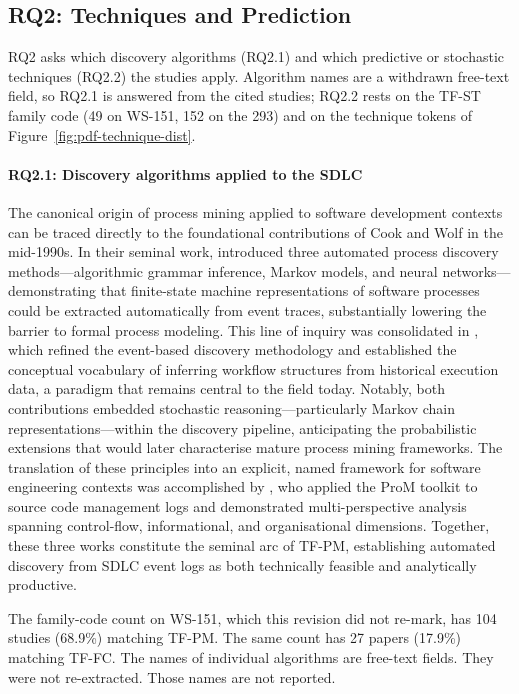 \subsection{RQ2: Techniques and Prediction}
\label{sec:slr-rq2}

RQ2 asks which discovery algorithms (RQ2.1) and which predictive or
stochastic techniques (RQ2.2) the studies apply. Algorithm names are a
withdrawn free-text field, so RQ2.1 is answered from the cited studies;
RQ2.2 rests on the TF-ST family code (49 on WS-151, 152 on the 293) and
on the technique tokens of Figure~\ref{fig:pdf-technique-dist}.

\paragraph{RQ2.1: Discovery algorithms applied to the SDLC} The canonical origin of process mining applied to software development contexts
can be traced directly to the foundational contributions of Cook and Wolf in the
mid-1990s. In their seminal work, \cite{cook1995} introduced three automated
process discovery methods---algorithmic grammar inference, Markov models, and
neural networks---demonstrating that finite-state machine representations of
software processes could be extracted automatically from event traces,
substantially lowering the barrier to formal process modeling. This line of
inquiry was consolidated in \cite{cook1998}, which refined the event-based
discovery methodology and established the conceptual vocabulary of inferring
workflow structures from historical execution data, a paradigm that remains
central to the field today. Notably, both contributions embedded stochastic
reasoning---particularly Markov chain representations---within the discovery
pipeline, anticipating the probabilistic extensions that would later characterise
mature process mining frameworks. The translation of these principles into an
explicit, named framework for software engineering contexts was accomplished by
\cite{rubin2007}, who applied the ProM toolkit to source code management logs
and demonstrated multi-perspective analysis spanning control-flow, informational,
and organisational dimensions. Together, these three works constitute the seminal
arc of TF-PM, establishing automated discovery from SDLC event logs as both
technically feasible and analytically productive.

The family-code count on WS-151, which
this revision did not re-mark, has 104 studies (68.9\%) matching TF-PM.
The same count has 27 papers (17.9\%) matching TF-FC.
The names of individual algorithms are free-text
fields. They were not re-extracted. Those names are not reported.

